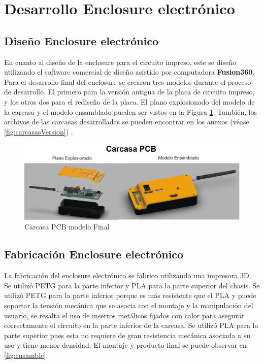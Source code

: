 
\section{Desarrollo Enclosure electrónico}
\subsection{Diseño Enclosure electrónico}

En cuanto al diseño de la enclosure para el circuito impreso, este se diseño utilizando el software comercial de diseño asistido por computadora \textbf{Fusion360}. Para el desarrollo final del enclosure se crearon tres modelos durante el proceso de desarrollo. El primero para la versión antigua de la placa de circuito impreso, y los otros dos para el rediseño de la placa. El plano explosionado del modelo de la carcasa y el modelo ensamblado pueden ser vistos en la Figura \ref{fig:carcasa}. También, los archivos de las carcasas desarrolladas se pueden encontrar en los anexos (véase \ref{fig:carcasasVersion}) .
\vspace{5 px}
\begin{figure}[H]
    \centering
    \includegraphics[width=\textwidth]{Imagenes/Metodologia/carcasa.png}
    \caption{Carcasa PCB modelo Final}
    \label{fig:carcasa}
\end{figure}

\vspace{5 px}
\subsection{Fabricación Enclosure electrónico}
 
La fabricación del enclosure electrónico se fabrico utilizando una impresora 3D. Se utilizó PETG para la parte inferior y PLA para la parte superior del chasis. Se utilizó PETG para la parte inferior porque es más resistente que el PLA y puede soportar la tensión mecánica que se asocia con el montaje y la manipulación del usuario, se resalta el uso de insertos metálicos fijados con calor para asegurar correctamente el circuito en la parte inferior de la carcasa. Se utilizó PLA para la parte superior pues esta no requiere de gran resistencia mecánica asociada a su uso y tiene menor densidad. El montaje y producto final se puede observar en \ref{fig:ensamble}. 


